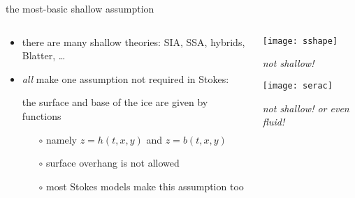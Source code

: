 \begin{frame}{the most-basic shallow assumption}

\begin{columns}

\begin{column}{0.6\textwidth}
\begin{itemize}
\item there are many shallow theories: SIA, SSA, hybrids, Blatter, \dots
\item \emph{all} make one assumption not required in Stokes:

\begin{center}
\alert{the surface and base of the ice are given by functions}
\end{center}
    \begin{itemize}
    \item[$\circ$] namely $z=h(t,x,y)$ and $z=b(t,x,y)$
    \item[$\circ$] surface overhang is not allowed
    \item[$\circ$] most Stokes models make this assumption too
    \end{itemize}
\end{itemize}
\end{column}

\begin{column}{0.4\textwidth}
\texttt{[image: sshape]}

\scriptsize
\begin{center}
\emph{not shallow!}
\end{center}
\vspace{6mm}

\texttt{[image: serac]}

\begin{center}
\emph{not shallow! or even fluid!}
\end{center}
\end{column}
\end{columns}
\end{frame}


